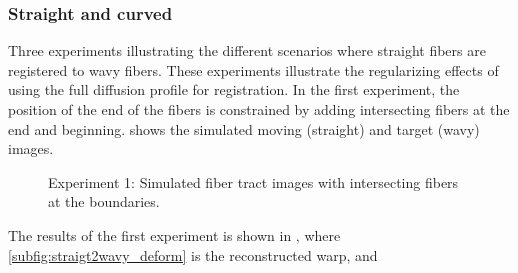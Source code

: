 \documentclass[twocolumn]{svjour3}
\begin{document}
\subsubsection{Straight and curved}

Three experiments illustrating the different scenarios where straight fibers are
registered to wavy fibers. These experiments illustrate the regularizing effects of using
the full diffusion profile for registration.  In the first experiment, the position of the
end of the fibers is constrained by adding intersecting fibers at the end and
beginning. shows the simulated moving (straight) and target
(wavy) images.
\begin{figure}[!ht]
  \centering
  \vspace*{-0.4cm}
  \hspace*{.5cm} 
  \caption{Experiment 1: Simulated fiber tract images with intersecting fibers at the boundaries.
  }
  \label{fig:straight2wavy_l}
\end{figure}
The results of the first experiment is shown in , where
\ref{subfig:straigt2wavy_deform} is the reconstructed warp, and
\end{document}
